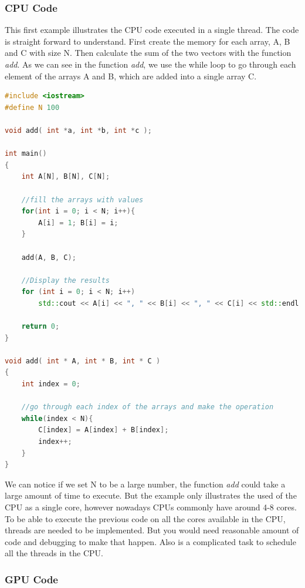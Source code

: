 \subsubsection{CPU Code}

This first example illustrates the CPU code executed in a single thread. The code is straight forward to understand. First create the memory for each array, A, B and C with size N. Then calculate the sum of the two vectors with the function \textit{add}. As we can see in the function \textit{add}, we use the while loop to go through each element of the arrays A and B, which are added into a single array C.

\begin{lstlisting}[language=C++, caption={CPU Vector Addition}]
#include <iostream>
#define N 100

void add( int *a, int *b, int *c );

int main()
{
    int A[N], B[N], C[N];
    
    //fill the arrays with values
    for(int i = 0; i < N; i++){
        A[i] = 1; B[i] = i;
    }
    
    add(A, B, C);
    
    //Display the results
    for (int i = 0; i < N; i++)
        std::cout << A[i] << ", " << B[i] << ", " << C[i] << std::endl;
    
    return 0;
}

void add( int * A, int * B, int * C )
{
    int index = 0;
    
    //go through each index of the arrays and make the operation
    while(index < N){
        C[index] = A[index] + B[index];
        index++;
    }
}

\end{lstlisting}

We can notice if we set N to be a large number, the function \textit{add} could take a large amount of time to execute. But the example only illustrates the used of the CPU as a single core, however nowadays CPUs commonly have around 4-8 cores. To be able to execute the previous code on all the cores available in the CPU, threads are needed to be implemented. But you would need reasonable amount of code and debugging to make that happen. Also is a complicated task to schedule all the threads in the CPU. 

\subsubsection{GPU Code}

